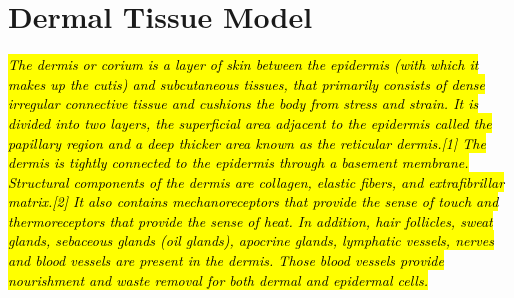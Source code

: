 \documentclass[12pt,a4paper]{report}
\begin{document}
\section{Dermal Tissue Model} \label{ssec:derm_tis_mod}
\hl{\textit{The dermis or corium is a layer of skin between the epidermis (with which it makes up the cutis) and subcutaneous tissues, that primarily consists of dense irregular connective tissue and cushions the body from stress and strain. It is divided into two layers, the superficial area adjacent to the epidermis called the papillary region and a deep thicker area known as the reticular dermis.[1] The dermis is tightly connected to the epidermis through a basement membrane. Structural components of the dermis are collagen, elastic fibers, and extrafibrillar matrix.[2] It also contains mechanoreceptors that provide the sense of touch and thermoreceptors that provide the sense of heat. In addition, hair follicles, sweat glands, sebaceous glands (oil glands), apocrine glands, lymphatic vessels, nerves and blood vessels are present in the dermis. Those blood vessels provide nourishment and waste removal for both dermal and epidermal cells.
}}
\end{document}
